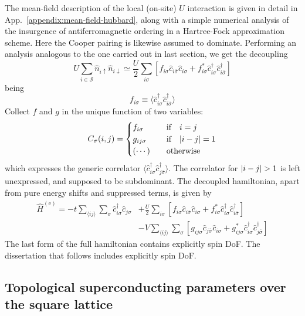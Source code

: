 The mean-field description of the local (on-site) $U$ interaction is given in detail in App.~\ref{appendix:mean-field-hubbard}, along with a simple numerical analysis of the insurgence of antiferromagnetic ordering in a Hartree-Fock approximation scheme. Here the Cooper pairing is likewise assumed to dominate. Performing an analysis analogous to the one carried out in last section, we get the decoupling
\[
	U \sum_{i \in \mathcal{S}} \hat n_{i\uparrow} \hat n_{i\downarrow} \simeq \frac{U}{2} \sum_{i\sigma} \left[
		f_{i\sigma} \hat c_{i\overline{\sigma}} \hat c_{i\sigma} + f_{i\sigma}^* \hat c_{i\sigma}^\dagger \hat c_{i\overline{\sigma}}^\dagger
	\right]
\]
being
\[
	f_{i\sigma} \equiv \langle \hat c_{i\sigma}^\dagger \hat c_{i\overline{\sigma}}^\dagger \rangle
\]
Collect $f$ and $g$ in the unique function of two variables:
\[
	C_\sigma(i,j) = \begin{cases}
		f_{i\sigma} &\qq{if} i=j \\
		g_{ij\sigma} &\qq{if} \abs{i-j}=1 \\
		(\cdots) &\qq{otherwise}
	\end{cases}
\]
which expresses the generic correlator $\langle \hat c_{i\sigma}^\dagger \hat c_{j\overline{\sigma}}^\dagger \rangle$. The correlator for $\abs{i-j}>1$ is left unexpressed, and supposed to be subdominant. The decoupled hamiltonian, apart from pure energy shifts and suppressed terms, is given by
\begin{align}
	\hat H^{(\mathrm{e})} =
	-t \sum_{\langle ij \rangle} \sum_\sigma \hat c_{i\sigma}^\dagger \hat c_{j\sigma}
	&+ \frac{U}{2} \sum_{i\sigma} \left[
		f_{i\sigma} \hat c_{i\overline{\sigma}} \hat c_{i\sigma} + f_{i\sigma}^* \hat c_{i\sigma}^\dagger \hat c_{i\overline{\sigma}}^\dagger
	\right] \nonumber \\
	&- V \sum_{\langle ij \rangle} \sum_\sigma \left[
	g_{ij\sigma} \hat c_{j\overline{\sigma}} \hat c_{i\sigma} + g_{ij\sigma}^* \hat c_{i\sigma}^\dagger \hat c_{j\overline{\sigma}}^\dagger
	\right] \label{eq:extended-hubbard-model-effective}
\end{align}
The last form of the full hamiltonian contains explicitly spin DoF. The dissertation that follows includes explicitly spin DoF.

\subsection{Topological superconducting parameters over the square lattice}

